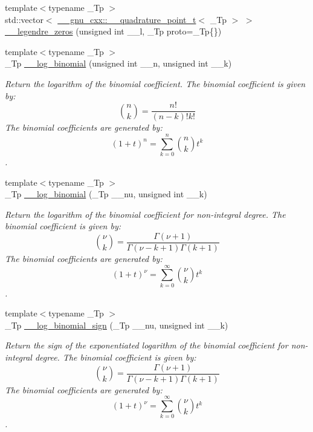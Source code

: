 \begin{DoxyCompactItemize}
\item 
{\footnotesize template$<$typename \+\_\+\+Tp $>$ }\\std\+::vector$<$ \hyperlink{struct____gnu__cxx_1_1____quadrature__point__t}{\+\_\+\+\_\+gnu\+\_\+cxx\+::\+\_\+\+\_\+quadrature\+\_\+point\+\_\+t}$<$ \+\_\+\+Tp $>$ $>$ \hyperlink{namespacestd_1_1____detail_a9d53ac0fd39232190e7564fa067a878d}{\+\_\+\+\_\+legendre\+\_\+zeros} (unsigned int \+\_\+\+\_\+l, \+\_\+\+Tp proto=\+\_\+\+Tp\{\})
\item 
{\footnotesize template$<$typename \+\_\+\+Tp $>$ }\\\+\_\+\+Tp \hyperlink{namespacestd_1_1____detail_a087d65f98ba6a6709b4d62fa32445e59}{\+\_\+\+\_\+log\+\_\+binomial} (unsigned int \+\_\+\+\_\+n, unsigned int \+\_\+\+\_\+k)
\begin{DoxyCompactList}\small\item\em Return the logarithm of the binomial coefficient. The binomial coefficient is given by\+: \[ \binom{n}{k} = \frac{n!}{(n-k)! k!} \] The binomial coefficients are generated by\+: \[ \left(1 + t\right)^n = \sum_{k=0}^n \binom{n}{k} t^k \]. \end{DoxyCompactList}\item 
{\footnotesize template$<$typename \+\_\+\+Tp $>$ }\\\+\_\+\+Tp \hyperlink{namespacestd_1_1____detail_af8613458310f575d1a1b162553abe4aa}{\+\_\+\+\_\+log\+\_\+binomial} (\+\_\+\+Tp \+\_\+\+\_\+nu, unsigned int \+\_\+\+\_\+k)
\begin{DoxyCompactList}\small\item\em Return the logarithm of the binomial coefficient for non-\/integral degree. The binomial coefficient is given by\+: \[ \binom{\nu}{k} = \frac{\Gamma(\nu+1)}{\Gamma(\nu-k+1) \Gamma(k+1)} \] The binomial coefficients are generated by\+: \[ \left(1 + t\right)^\nu = \sum_{k=0}^\infty \binom{\nu}{k} t^k \]. \end{DoxyCompactList}\item 
{\footnotesize template$<$typename \+\_\+\+Tp $>$ }\\\+\_\+\+Tp \hyperlink{namespacestd_1_1____detail_aa89a8a5ced6325e1d64782f84e4ad95d}{\+\_\+\+\_\+log\+\_\+binomial\+\_\+sign} (\+\_\+\+Tp \+\_\+\+\_\+nu, unsigned int \+\_\+\+\_\+k)
\begin{DoxyCompactList}\small\item\em Return the sign of the exponentiated logarithm of the binomial coefficient for non-\/integral degree. The binomial coefficient is given by\+: \[ \binom{\nu}{k} = \frac{\Gamma(\nu+1)}{\Gamma(\nu-k+1) \Gamma(k+1)} \] The binomial coefficients are generated by\+: \[ \left(1 + t\right)^\nu = \sum_{k=0}^\infty \binom{\nu}{k} t^k \]. \end{DoxyCompactList}\item 

\end{DoxyCompactItemize}
